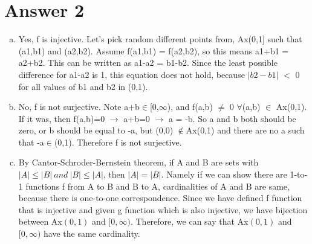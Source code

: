 \documentclass[11pt]{article}
\begin{document}
\section*{Answer 2}
    \begin{enumerate}[(a)]
        \item Yes, f is injective. Let's pick random different points from, Ax(0,1] such that (a1,b1) and (a2,b2). Assume f(a1,b1) = f(a2,b2), so this means a1+b1 = a2+b2. This can be written as a1-a2 = b1-b2. Since the least possible difference for a1-a2 is 1, this equation does not hold, because $|b2-b1|$ $<$ 0 for all values of b1 and b2 in (0,1). 
        
        \item No, f is not surjective. Note a+b$\in$[0,$\infty$), and f(a,b) $\neq$ 0 $\forall$(a,b) $\in$ Ax(0,1). If it was, then f(a,b)=0 $\rightarrow$ a+b=0 $\rightarrow$ a = -b. So a and b both should be zero, or b should be equal to -a, but (0,0) $\notin$Ax(0,1) and there are no a such that -a$\in$(0,1). Therefore f is not surjective.
        
        \item By Cantor-Schroder-Bernstein theorem, if A and B are sets with $|A|\leq|B|\:and\:|B|\leq|A|$, then $|A| = |B|$. Namely if we can show there are 1-to-1 functions f from A to B and B to A, cardinalities of A and B are same, because there is one-to-one correspondence. Since we have defined f function that is injective and given g function which is also injective, we have bijection between Ax$(0,1)$ and $[0,\infty)$. Therefore, we can say that Ax$(0,1)$ and $[0,\infty)$ have the same cardinality.
    \end{enumerate}
\newpage
\end{document}
